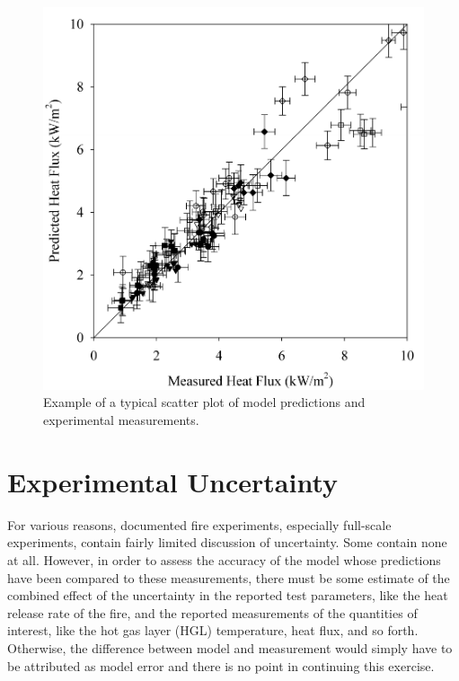 \begin{figure}[t]
\begin{center}
\includegraphics[height=3.in]{FIGURES/scatterplot}
\end{center}
\caption[Sample scatter plot.]{Example of a typical scatter plot of model predictions and experimental measurements.}
\label{scatterplot}
\end{figure}





\section{Experimental Uncertainty}

For various reasons, documented fire experiments, especially full-scale experiments, contain fairly limited discussion of uncertainty. Some contain none at all.
However, in order to assess the accuracy of the model whose predictions have been compared to these measurements, there must be some estimate of the
combined effect of the uncertainty in the reported test parameters, like the heat release rate of the fire,
and the reported measurements of the quantities of interest, like the hot gas layer (HGL)
temperature, heat flux, and so forth. Otherwise, the difference between model and measurement would simply have to be attributed as model error and there is no point in
continuing this exercise.

